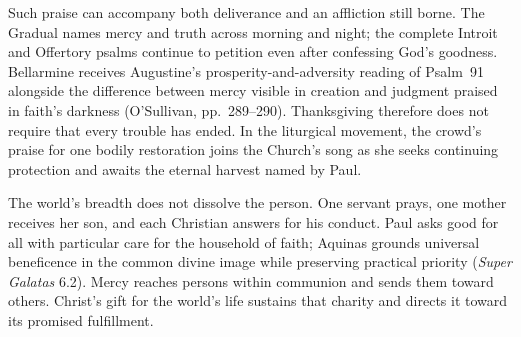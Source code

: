 Such praise can accompany both deliverance and an affliction still borne.
The Gradual names mercy and truth across morning and night; the complete
Introit and Offertory psalms continue to petition even after confessing
God's goodness. Bellarmine receives Augustine's prosperity-and-adversity
reading of Psalm~91 alongside the difference between mercy visible in
creation and judgment praised in faith's darkness (O'Sullivan,
pp.~289--290). Thanksgiving therefore does not require that every trouble
has ended. In the liturgical movement, the crowd's praise for one bodily
restoration joins the Church's song as she seeks continuing protection
and awaits the eternal harvest named by Paul.

The world's breadth does not dissolve the person. One servant prays, one
mother receives her son, and each Christian answers for his conduct.
Paul asks good for all with particular care for the household of faith;
Aquinas grounds universal beneficence in the common divine image while
preserving practical priority (\emph{Super Galatas} 6.2). Mercy reaches
persons within communion and sends them toward others. Christ's gift for
the world's life sustains that charity and directs it toward its promised
fulfillment.

\endgroup
\clearpage
